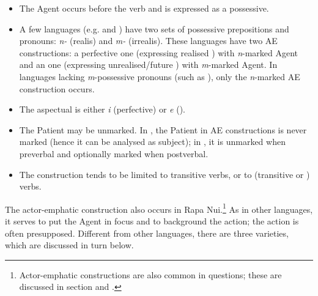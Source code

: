 \begin{itemize}
\item 
The Agent occurs before the verb and is expressed as a possessive. 

\item 
A few languages (e.g.  and ) have two sets of possessive prepositions and pronouns: \textit{n-} (realis) and \textit{m-} (irrealis). These languages have two AE constructions: a perfective one (expressing realised ) with \textit{n}{}-marked Agent and an  one (expressing unrealised/future ) with \textit{m}{}-marked Agent. In languages lacking \textit{m}{}-possessive pronouns (such as ), only the \textit{n}{}-marked AE construction occurs.

\item 
The aspectual is either \textit{i} (perfective) or \textit{e} ().

\item 
The Patient may be unmarked. In , the Patient in AE constructions is never marked (hence it can be analysed as subject); in , it is unmarked when preverbal and optionally marked when postverbal.

\item 
The construction tends to be limited to transitive verbs, or to (transitive or )  verbs.

\end{itemize}

The actor-emphatic construction also occurs in Rapa Nui.\footnote{\label{fn:429}Actor-emphatic constructions are also common in questions; these are discussed in section  and .} As in other languages, it serves to put the Agent in focus and to background the action; the action is often presupposed. Different from other languages, there are three varieties, which are discussed in turn below.

